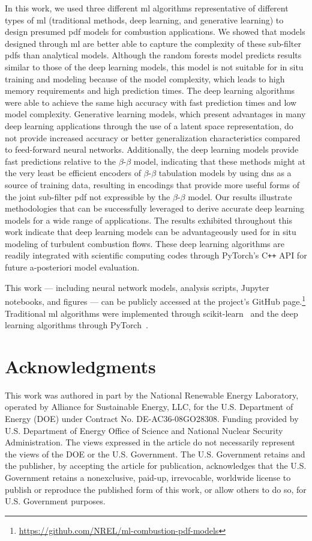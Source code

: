 \documentclass[review]{elsarticle}
\begin{document}
In this work, we used three different \gls{ml} algorithms
representative of different types of \gls{ml} (traditional
methods, deep learning, and generative learning) to design presumed
\gls{pdf} models for combustion applications. We showed that models
designed through \gls{ml} are better able to capture the
complexity of these sub-filter \glspl{pdf} than analytical
models. Although the random forests model predicts results similar to those of the
deep learning models, this model is not suitable for in situ training
and modeling because of the model complexity, which leads to high memory
requirements and high prediction times. The deep learning algorithms
were able to achieve the same high accuracy with fast prediction
times and low model complexity. Generative learning models, which
present advantages in many deep learning applications through the use
of a latent space representation, do not provide increased accuracy or
better generalization characteristics compared to feed-forward neural
networks. Additionally, the deep learning models provide fast
predictions relative to the $\beta$-$\beta$ model, indicating that
these methods might at the very least be efficient encoders of
$\beta$-$\beta$ tabulation models by using \gls{dns} as a source of
training data, resulting in encodings that provide more useful forms
of the joint sub-filter \gls{pdf} not expressible by the
$\beta$-$\beta$ model. Our results illustrate methodologies that can
be successfully leveraged to derive accurate deep learning models for
a wide range of applications. The results exhibited throughout this
work indicate that deep learning models can be advantageously used for
in situ modeling of turbulent combustion flows. These deep learning
algorithms are readily integrated with scientific computing codes
through PyTorch's C\texttt{++} API for future a-posteriori model
evaluation.

This work --- including neural network models, analysis scripts, Jupyter
notebooks, and figures --- can be publicly accessed at the project's
GitHub
page.\footnote{\url{https://github.com/NREL/ml-combustion-pdf-models}}
Traditional \gls{ml} algorithms were implemented through
scikit-learn~\cite{Pedregosa2011} and the deep learning algorithms
through PyTorch~\cite{Paszke2017}.

\section*{Acknowledgments}
This work was authored in part by the National Renewable Energy Laboratory, operated by Alliance for Sustainable Energy, LLC, for the U.S. Department of Energy (DOE) under Contract No. DE-AC36-08GO28308. Funding provided by U.S. Department of Energy Office of Science and National Nuclear Security Administration. The views expressed in the article do not necessarily represent the views of the DOE or the U.S. Government. The U.S. Government retains and the publisher, by accepting the article for publication, acknowledges that the U.S. Government retains a nonexclusive, paid-up, irrevocable, worldwide license to publish or reproduce the published form of this work, or allow others to do so, for U.S. Government purposes.
\end{document}
